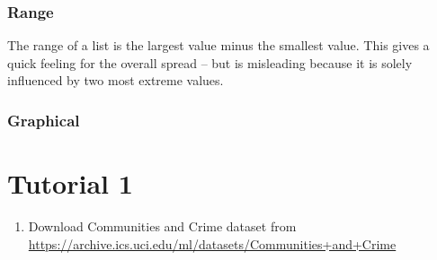 \documentclass[twoside]{article}
\theoremstyle{definition}
\theoremstyle{definition}
\begin{document}
\subsubsection{Range}
The range of a list is the largest value minus the smallest value.
This gives a quick feeling for the overall spread – but is misleading
because it is solely influenced by two most extreme values.
\subsubsection{Graphical}

\section{Tutorial 1}
\begin{enumerate}
\item Download Communities and Crime dataset from \\
\href{(https://archive.ics.uci.edu/ml/datasets/Communities+and+Crime)}{https://archive.ics.uci.edu/ml/datasets/Communities+and+Crime}


\end{enumerate}
\end{document}
